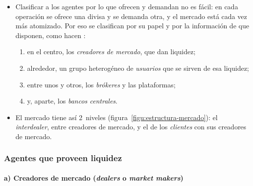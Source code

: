 \documentclass[11pt]{article}
\begin{document}
\begin{itemize}
\item Clasificar a los agentes por lo que ofrecen y demandan no es fácil: en cada operación se ofrece una divisa y se demanda otra, y el mercado está cada vez más atomizado. Por eso se clasifican por su papel y por la información de que disponen, como hacen \textcite{KingOslerRime2012}:
  \begin{enumerate}
  \item en el centro, los \emph{creadores de mercado}, que dan liquidez;
  \item alrededor, un grupo heterogéneo de \emph{usuarios} que se sirven de esa liquidez;
  \item entre unos y otros, los \emph{brókeres} y las plataformas;
  \item y, aparte, los \emph{bancos centrales}.
  \end{enumerate}
\item El mercado tiene así 2~niveles (figura~\ref{figu:estructura-mercado}): el \emph{interdealer}, entre creadores de mercado, y el de los \emph{clientes} con sus creadores de mercado.
\end{itemize}

\begin{infografia}[H]
\centering
\caption{Los 2~niveles del mercado de divisas}\label{figu:estructura-mercado}
\end{infografia}

\subsubsection{Agentes que proveen liquidez}\label{sec:proveedores}

\paragraph{a) Creadores de mercado (\emph{dealers} o \emph{market makers})}
\end{document}
